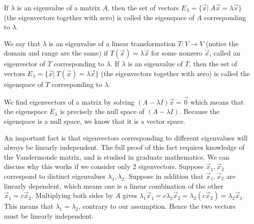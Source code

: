 \begin{definition}[Eigenspaces]
If $\lambda$ is an eigenvalue of a matrix $A$, then the set of vectors $E_\lambda = \{\vec x | \ A\vec x = \lambda \vec x\}$ (the eigenvectors together with zero) is called the eigenspace of $A$ corresponding to $\lambda$. 

We say that $\lambda$ is an eigenvalue of a linear transformation $T:V\to V$ (notice the domain and range are the same) if 
$T(\vec x)=\lambda \vec x$ for some nonzero $\vec x$, called an eigenvector of $T$ corresponding to $\lambda$. 
If $\lambda$ is an eigenvalue of $T$, then the set of vectors $E_\lambda = \{\vec x | \ T(\vec x) = \lambda \vec x\}$ (the eigenvectors together with zero) is called the eigenspace of $T$ corresponding to $\lambda$. 
\end{definition}
We find eigenvectors of a matrix by solving $(A-\lambda I)\vec x = \vec 0$ which means that the eigenspace $E_\lambda$ is precisely the null space of $(A-\lambda I)$.  Because the eigenspace is a null space, we know that it is a vector space.


An important fact is that eigenvectors corresponding to different eigenvalues will always be linearly independent.  The full proof of this fact requires knowledge of the Vandermonde matrix, and is studied in graduate mathematics. We can discuss why this works if we consider only 2 eigenvectors.  Suppose $\vec x_1,\vec x_2$ correspond to distinct eigenvalues $\lambda_1,\lambda_2$.  Suppose in addition that $\vec x_1,\vec x_2$ are linearly dependent, which means one is a linear combination of the other $\vec x_1=c\vec x_2$.  Multiplying both sides by $A$ gives $\lambda_1 \vec x_1 = c\lambda_2\vec x_2 = \lambda_2 (c\vec x_2) = \lambda_2\vec x_1.$ This means that $\lambda_1=\lambda_2$, contrary to our assumption. Hence the two vectors must be linearly independent.

